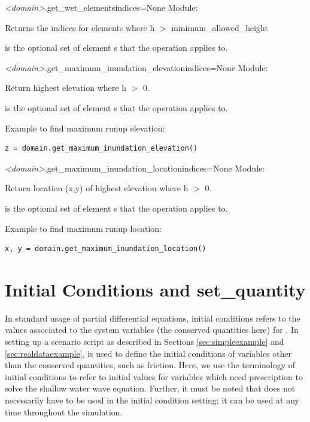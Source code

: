 \documentclass{manual}
\begin{document}
\begin{methoddesc}{\emph{<domain>}.get_wet_elements}{indices=None}
Module: 

Returns the indices for elements where h $>$ minimum_allowed_height

 is the optional set of element s that
the operation applies to.
\end{methoddesc}

\begin{methoddesc}{\emph{<domain>}.get_maximum_inundation_elevation}{indices=None}
Module: 

Return highest elevation where h $>$ 0.

 is the optional set of element s that
the operation applies to.

Example to find maximum runup elevation:
\begin{verbatim}
z = domain.get_maximum_inundation_elevation()
\end{verbatim}
\end{methoddesc}

\begin{methoddesc}{\emph{<domain>}.get_maximum_inundation_location}{indices=None}
Module: 

Return location (x,y) of highest elevation where h $>$ 0.

 is the optional set of element s that
the operation applies to.

Example to find maximum runup location:
\begin{verbatim}
x, y = domain.get_maximum_inundation_location()
\end{verbatim}
\end{methoddesc}





\chapter{Initial Conditions and set_quantity}
\label{sec:initial conditions}

In standard usage of partial differential equations, initial conditions
refers to the values associated to the system variables (the conserved
quantities here) for . In setting up a scenario script
as described in Sections \ref{sec:simpleexample} and \ref{sec:realdataexample},
 is used to define the initial conditions of variables
other than the conserved quantities, such as friction. Here, we use the terminology
of initial conditions to refer to initial values for variables which need
prescription to solve the shallow water wave equation. Further, it must be noted
that  does not necessarily have to be used in the initial
condition setting; it can be used at any time throughout the simulation.
\end{document}
